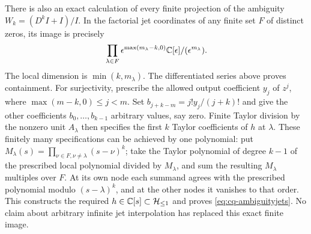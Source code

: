 There is also an exact calculation of every finite projection of
the ambiguity $W_k=(D^kI+I)/I$. In the factorial jet coordinates
of any finite set $F$ of distinct zeros, its image is precisely
\begin{equation}\label{eq:cq-ambiguityjets}
 \prod_{\lambda\in F}
 \epsilon^{\max(m_\lambda-k,0)}
       \mathbb C[\epsilon]/(\epsilon^{m_\lambda}).
\end{equation}
The local dimension is $\min(k,m_\lambda)$. The differentiated
series above proves containment. For surjectivity, prescribe the
allowed output coefficient $y_j$ of $z^j$, where
$\max(m-k,0)\leq j<m$. Set
$b_{j+k-m}=j!y_j/(j+k)!$ and give the other coefficients
$b_0,\ldots,b_{k-1}$ arbitrary values, say zero. Finite Taylor
division by the nonzero unit $A_\lambda$ then specifies the first
$k$ Taylor coefficients of $h$ at $\lambda$.
These finitely many specifications can be achieved by one polynomial:
put $M_\lambda(s)=\prod_{\nu\in F,\nu\ne\lambda}(s-\nu)^k$;
take the Taylor polynomial of degree $k-1$ of the prescribed local
polynomial divided by $M_\lambda$, and sum the resulting
$M_\lambda$ multiples over $F$. At its own node each summand
agrees with the prescribed polynomial modulo $(s-\lambda)^k$,
and at the other nodes it vanishes to that order. This constructs
the required $h\in\mathbb C[s]\subset\mathcal H_{\leq 1}$ and proves
\eqref{eq:cq-ambiguityjets}. No claim about arbitrary infinite jet
interpolation has replaced this exact finite image.

